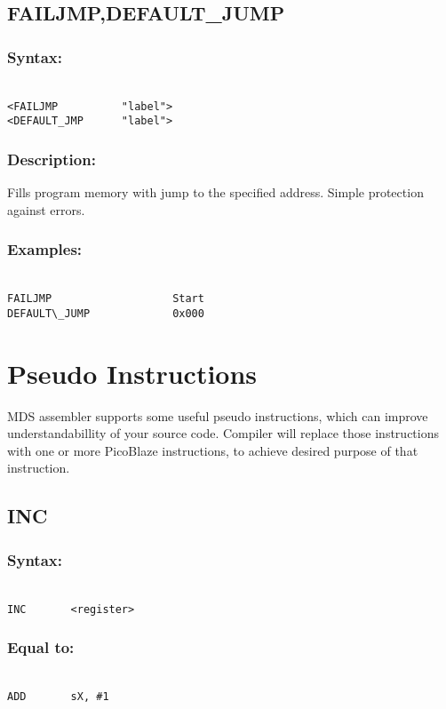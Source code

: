     \subsection{FAILJMP,DEFAULT\_JUMP}
        \subsubsection{Syntax:}
            {
                ~\\
                \usecodefont
                \verb'<FAILJMP          "label">'\\
                \verb'<DEFAULT_JMP      "label">'
            }

        \subsubsection{Description:}
        Fills program memory with jump to the specified address. Simple protection against errors.

        \subsubsection{Examples:}
            {
                ~\\
                \usecodefont
                \verb'FAILJMP                   Start'\\
                \verb'DEFAULT\_JUMP             0x000'\\
            }


\section{Pseudo Instructions}
MDS assembler supports some useful pseudo instructions, which can improve understandabillity of your source code. Compiler will replace those instructions with one or more PicoBlaze instructions, to achieve desired purpose of that instruction.

    \subsection{INC}
        \subsubsection{Syntax:}
        {
            ~\\
            \usecodefont
            \verb'INC       <register>'
        }
        \subsubsection{Equal to:}
        {
            ~\\
            \usecodefont
            \verb'ADD       sX, #1'
        }
